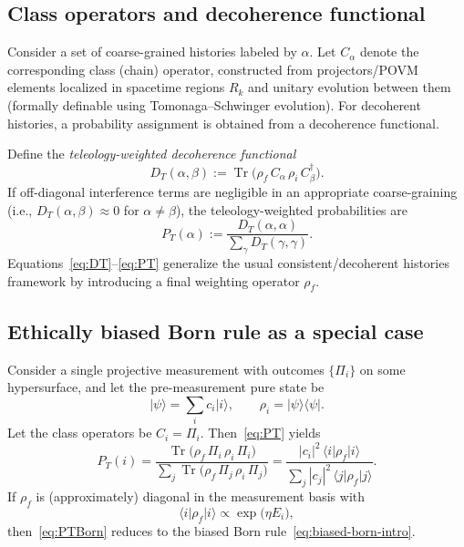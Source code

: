 \documentclass[reprint,amsmath,amssymb,aps,showkeys]{revtex4-2}
\newcommand{\bra}[1]{\langle #1\rvert}
\newcommand{\ket}[1]{\lvert #1\rangle}
\newcommand{\Tr}{\operatorname{Tr}}
\begin{document}
\subsection{Class operators and decoherence functional}
Consider a set of coarse-grained histories labeled by $\alpha$. Let $C_{\alpha}$ denote the corresponding class (chain) operator, constructed from projectors/POVM elements localized in spacetime regions $R_k$ and unitary evolution between them (formally definable using Tomonaga--Schwinger evolution). For decoherent histories, a probability assignment is obtained from a decoherence functional.

Define the \emph{teleology-weighted decoherence functional}
\begin{equation}
D_T(\alpha,\beta) := \Tr\Big(\rho_f\, C_{\alpha}\,\rho_i\, C_{\beta}^{\dagger}\Big).
\label{eq:DT}
\end{equation}
If off-diagonal interference terms are negligible in an appropriate coarse-graining (i.e., $D_T(\alpha,\beta)\approx 0$ for $\alpha\ne\beta$), the teleology-weighted probabilities are
\begin{equation}
P_T(\alpha) := \frac{D_T(\alpha,\alpha)}{\sum_{\gamma} D_T(\gamma,\gamma)}.
\label{eq:PT}
\end{equation}
Equations~\eqref{eq:DT}--\eqref{eq:PT} generalize the usual consistent/decoherent histories framework by introducing a final weighting operator $\rho_f$.

\subsection{Ethically biased Born rule as a special case}
Consider a single projective measurement with outcomes $\{\Pi_i\}$ on some hypersurface, and let the pre-measurement pure state be
\begin{equation}
\ket{\psi} = \sum_i c_i\ket{i},\qquad \rho_i=\ket{\psi}\bra{\psi}.
\end{equation}
Let the class operators be $C_i=\Pi_i$. Then~\eqref{eq:PT} yields
\begin{equation}
P_T(i)=\frac{\Tr\big(\rho_f\,\Pi_i\,\rho_i\,\Pi_i\big)}{\sum_j\Tr\big(\rho_f\,\Pi_j\,\rho_i\,\Pi_j\big)}
=\frac{|c_i|^2\,\bra{i}\rho_f\ket{i}}{\sum_j |c_j|^2\,\bra{j}\rho_f\ket{j}}.
\label{eq:PTBorn}
\end{equation}
If $\rho_f$ is (approximately) diagonal in the measurement basis with
\begin{equation}
\bra{i}\rho_f\ket{i}\propto \exp\Big(\eta E_i\Big),
\label{eq:diagweight}
\end{equation}
then~\eqref{eq:PTBorn} reduces to the biased Born rule~\eqref{eq:biased-born-intro}.
\end{document}
